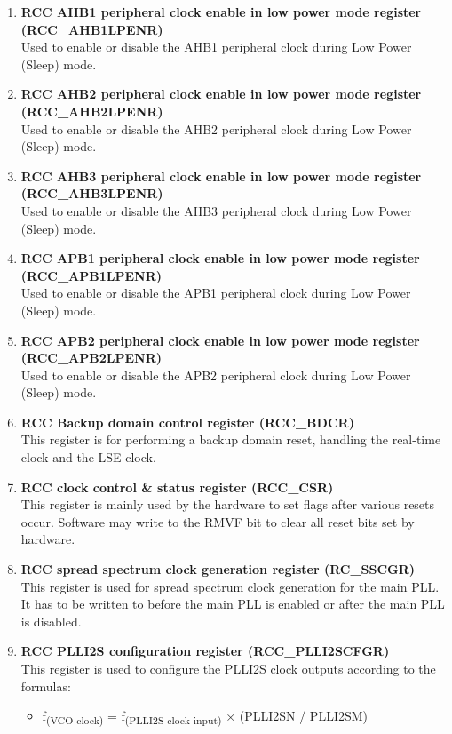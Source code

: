 \documentclass[12pt]{article}
\begin{document}
\begin{enumerate}
    \item \textbf{RCC AHB1 peripheral clock enable in low power mode register (RCC\_AHB1LPENR)}
    \\ Used to enable or disable the AHB1 peripheral clock during Low Power (Sleep) mode.
    \item \textbf{RCC AHB2 peripheral clock enable in low power mode register (RCC\_AHB2LPENR)}
    \\ Used to enable or disable the AHB2 peripheral clock during Low Power (Sleep) mode.
    \item \textbf{RCC AHB3 peripheral clock enable in low power mode register (RCC\_AHB3LPENR)}
    \\ Used to enable or disable the AHB3 peripheral clock during Low Power (Sleep) mode.
    \item \textbf{RCC APB1 peripheral clock enable in low power mode register (RCC\_APB1LPENR)}
    \\ Used to enable or disable the APB1 peripheral clock during Low Power (Sleep) mode.
    \item \textbf{RCC APB2 peripheral clock enable in low power mode register (RCC\_APB2LPENR)}
    \\ Used to enable or disable the APB2 peripheral clock during Low Power (Sleep) mode.
    \item \textbf{RCC Backup domain control register (RCC\_BDCR)}
        \\ This register is for performing a backup domain reset, handling the real-time clock and the LSE clock.
    \item \textbf{RCC clock control \& status register (RCC\_CSR)}
        \\ This register is mainly used by the hardware to set flags after various resets occur. Software may write to the RMVF bit to clear all reset bits set by hardware.
    \item \textbf{RCC spread spectrum clock generation register (RC\_SSCGR)}
        \\ This register is used for spread spectrum clock generation for the main PLL. It has to be written to before the main PLL is enabled or after the main PLL is disabled.
    \item \textbf{RCC PLLI2S configuration register (RCC\_PLLI2SCFGR)}
        \\ This register is used to configure the PLLI2S clock outputs according to the formulas:
        \begin{itemize}
            \item f\textsubscript{(VCO clock)} = f\textsubscript{(PLLI2S clock input)} × (PLLI2SN / PLLI2SM)

\end{itemize}
\end{enumerate}
\end{document}
